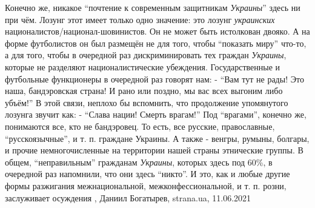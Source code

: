 Конечно же, никакое \enquote{почтение к современным защитникам \emph{Украины}} здесь ни при
чём. Лозунг этот имеет только одно значение: это лозунг \emph{украинских}
националистов/национал-шовинистов. Он не может быть истолкован двояко.  А на
форме футболистов он был размещён не для того, чтобы \enquote{показать миру} что-то, а
для того, чтобы в очередной раз дискриминировать тех граждан \emph{Украины}, которые
не разделяют националистические убеждения. Государственные и футбольные
функционеры в очередной раз говорят нам: - \enquote{Вам тут не рады! Это наша,
бандэровская страна! И рано или поздно, мы вас всех выгоним либо убъём!} В этой
связи, неплохо бы вспомнить, что продолжение упомянутого лозунга звучит как: -
\enquote{Слава нации! Смерть врагам!} Под \enquote{врагами}, конечно же, понимаются все, кто не
бандэровец. То есть, все русские, православные, \enquote{русскоязычные}, и т. п.
граждане Украины. А также - венгры, румыны, болгары, и прочие немногочисленные
на территории нашей страны этнические группы.  В общем, \enquote{неправильным}
гражданам \emph{Украины}, которых здесь под 60\%, в очередной раз напомнили, что они
здесь \enquote{никто}. И это, как и любые другие формы разжигания межнациональной,
межконфессиональной, и т. п. розни, заслуживает осуждения
, 
Даниил Богатырев, strana.ua, 11.06.2021

